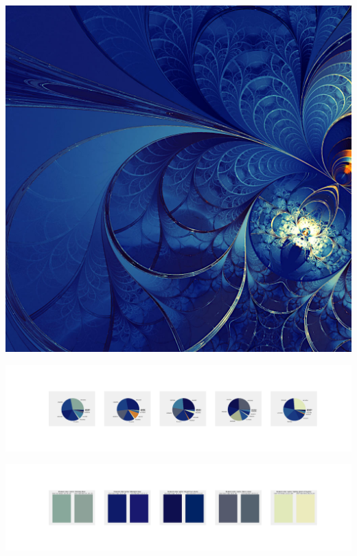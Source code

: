 \documentclass[11pt]{article}
\begin{document}
\begin{landscape}
    \begin{center}
    \includegraphics[width=\textwidth]{./nbimg/file (451).jpg}
    \end{center}

    \begin{center}
    \includegraphics[width=250mm]{./nbimg/pie-391.jpg}
    \end{center}

    \begin{center}
    \includegraphics[width=250mm]{./nbimg/peak-391.jpg}
    \end{center}
    


\end{landscape}
\end{document}
